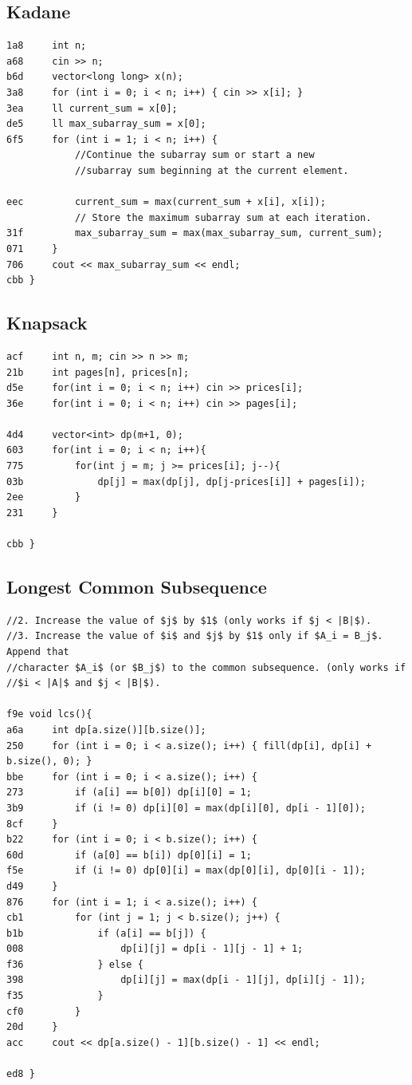 \documentclass[11pt, a4paper, twoside]{article}
\begin{document}
\subsection{Kadane}
\begin{lstlisting}
1a8     int n;
a68 	cin >> n;
b6d 	vector<long long> x(n);
3a8 	for (int i = 0; i < n; i++) { cin >> x[i]; }
3ea 	ll current_sum = x[0];
de5 	ll max_subarray_sum = x[0];
6f5 	for (int i = 1; i < n; i++) {
    		//Continue the subarray sum or start a new
    		//subarray sum beginning at the current element.
    		
eec 		current_sum = max(current_sum + x[i], x[i]);
    		// Store the maximum subarray sum at each iteration.
31f 		max_subarray_sum = max(max_subarray_sum, current_sum);
071 	}
706 	cout << max_subarray_sum << endl;
cbb }
\end{lstlisting}

\subsection{Knapsack}
\begin{lstlisting}
acf     int n, m; cin >> n >> m;
21b     int pages[n], prices[n];
d5e     for(int i = 0; i < n; i++) cin >> prices[i];
36e     for(int i = 0; i < n; i++) cin >> pages[i];
 
4d4     vector<int> dp(m+1, 0);
603     for(int i = 0; i < n; i++){
775         for(int j = m; j >= prices[i]; j--){
03b             dp[j] = max(dp[j], dp[j-prices[i]] + pages[i]);
2ee         }
231     }

cbb }
\end{lstlisting}

\subsection{Longest Common Subsequence}
\begin{lstlisting}
//2. Increase the value of $j$ by $1$ (only works if $j < |B|$).
//3. Increase the value of $i$ and $j$ by $1$ only if $A_i = B_j$. Append that
//character $A_i$ (or $B_j$) to the common subsequence. (only works if
//$i < |A|$ and $j < |B|$).

f9e void lcs(){
a6a 	int dp[a.size()][b.size()];
250 	for (int i = 0; i < a.size(); i++) { fill(dp[i], dp[i] + b.size(), 0); }
bbe 	for (int i = 0; i < a.size(); i++) {
273 		if (a[i] == b[0]) dp[i][0] = 1;
3b9 		if (i != 0) dp[i][0] = max(dp[i][0], dp[i - 1][0]);
8cf 	}
b22 	for (int i = 0; i < b.size(); i++) {
60d 		if (a[0] == b[i]) dp[0][i] = 1;
f5e 		if (i != 0) dp[0][i] = max(dp[0][i], dp[0][i - 1]);
d49 	}
876 	for (int i = 1; i < a.size(); i++) {
cb1 		for (int j = 1; j < b.size(); j++) {
b1b 			if (a[i] == b[j]) {
008 				dp[i][j] = dp[i - 1][j - 1] + 1;
f36 			} else {
398 				dp[i][j] = max(dp[i - 1][j], dp[i][j - 1]);
f35 			}
cf0 		}
20d 	}
acc 	cout << dp[a.size() - 1][b.size() - 1] << endl;
    	
ed8 }
\end{lstlisting}
\end{document}
